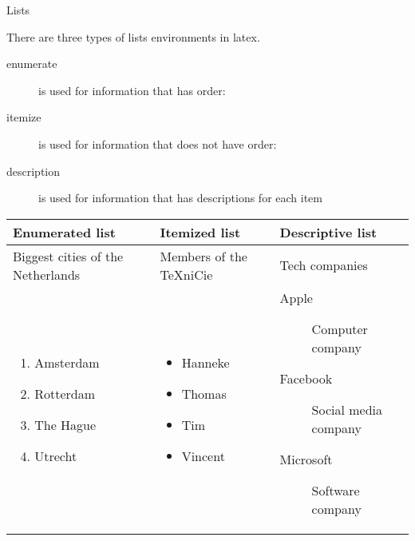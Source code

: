 \begin{frame}[fragile]{Lists}

There are three types of lists environments in latex.


\begin{description}
	\item[enumerate]  is used for information that has order:
	\item[itemize] is used for information that does not have order:
	\item[description] is used for information that has descriptions for each item
\end{description}
	\begin{tcolorbox}[width=13cm, title={Examples}, size=small]
	\begin{tabular}{m{3cm}| m{3cm} | m{5cm}}
		\textbf{Enumerated list} & \textbf{Itemized list} & \textbf{Descriptive list}\\
		\hline
		Biggest cities of the Netherlands &Members of the TeXniCie &   Tech companies\\
		\hline
		\begin{enumerate}[label=\arabic*.]
			\item Amsterdam 
			\item Rotterdam
			\item The Hague
			\item Utrecht
		\end{enumerate}
		&
		\begin{itemize}[label=\textbullet]
			\item Hanneke 
			\item Thomas
			\item Tim
			\item Vincent
		\end{itemize}
		& 
		\begin{description}
			\item[Apple] Computer company
			\item[Facebook] Social media company
			\item[Microsoft] Software company
		\end{description}
	\end{tabular}
	\end{tcolorbox}
\end{frame}

